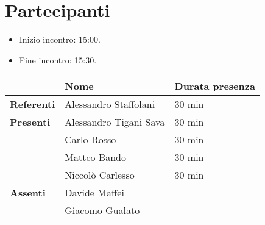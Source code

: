 \section{Partecipanti}

\begin{itemize}
    \item Inizio incontro: 15:00.
	\item Fine incontro: 15:30.
\end{itemize}


\begin{center}
{\renewcommand{\arraystretch}{1.5}
\begin{tabular}{l|ll}
	                    & \textbf{Nome}  			& \textbf{Durata presenza} 	\\
	\hline 
	\textbf{Referenti} 	& Alessandro Staffolani		& 30 min	\\
	\hline
	\textbf{Presenti}   & Alessandro Tigani Sava    & 30 min 	\\   
		  				& Carlo Rosso           	& 30 min 	\\           
						& Matteo Bando        		& 30 min 	\\       
						& Niccolò Carlesso       	& 30 min 	\\   
	\hline
	\textbf{Assenti}	& Davide Maffei          	& 	\\   
						& Giacomo Gualato           & 	\\
\end{tabular}	
}
\end{center}
